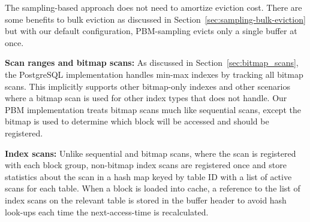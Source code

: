 The sampling-based approach does not need to amortize eviction cost. There are some benefits to bulk eviction as discussed in Section~\ref{sec:sampling-bulk-eviction} but with our default configuration, PBM-sampling evicts only a single buffer at once.



\textbf{Scan ranges and bitmap scans:} As discussed in Section~\ref{sec:bitmap_scans}, the PostgreSQL implementation handles min-max indexes by tracking all bitmap scans. This implicitly supports other bitmap-only indexes and other scenarios where a bitmap scan is used for other index types that \cite{pbm} does not handle. Our PBM implementation treats bitmap scans much like sequential scans, except the bitmap is used to determine which block will be accessed and should be registered.


\textbf{Index scans:} Unlike sequential and bitmap scans, where the scan is registered with each block group, non-bitmap index scans are registered once and store statistics about the scan in a hash map keyed by table ID with a list of active scans for each table. When a block is loaded into cache, a reference to the list of index scans on the relevant table is stored in the buffer header to avoid hash look-ups each time the next-access-time is recalculated.





